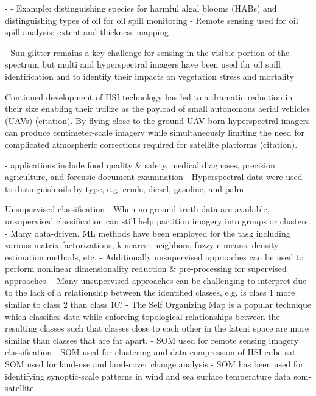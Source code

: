 \documentclass{article}
\begin{document}
- \cite{koponen2002lake}
- Example: distinguishing species for harmful algal blooms (HABs) and distinguishing types of oil for oil spill monitoring
- Remote sensing used for oil spill analysis: extent and thickness mapping \cite{kokaly2013spectroscopic, leifer2012state}

- Sun glitter remains a key challenge for sensing in the visible portion of the spectrum but multi and hyperspectral imagers have been used for oil spill identification and to identify their impacts on vegetation stress and mortality \cite{fingas2014review, khan2018modern}


Continued development of HSI technology has led to a dramatic reduction in their size enabling their utilize as the payload of small autonomous aerial vehicles (UAVs) (citation). By flying close to the ground UAV-born hyperspectral imagers can produce centimeter-scale imagery while simultaneously limiting the need for complicated atmospheric corrections required for satellite platforms (citation).

- applications include food quality & safety, medical diagnoses, precision agriculture, and forensic document examination \cite{khan2018modern}
- Hyperspectral data were used to distinguish oils by type, e.g. crude, diesel, gasoline, and palm \cite{yang2020characterization}


Unsupervised classification
- When no ground-truth data are available, unsupervised classification can still help partition imagery into groups or clusters.
- Many data-driven, ML methods have been employed for the task including various matrix factorizations, k-nearest neighbors, fuzzy c-means, density estimation methods, etc. \cite{zhang2019hyperspectral}
- Additionally unsupervised approaches can be used to perform nonlinear dimensionality reduction & pre-processing for supervised approaches.
- Many unsupervised approaches can be challenging to interpret due to the lack of a relationship between the identified classes, e.g. is class 1 more similar to class 2 than class 10?
- The Self Organizing Map is a popular technique which classifies data while enforcing topological relationships between the resulting classes such that classes close to each  other in the latent space are more similar than classes that are far apart.
- SOM used for remote sensing imagery classification \cite{msom-remote-sensing}
- SOM used for clustering and data compression of HSI cube-sat \cite{danielsen2021self}
- SOM used for land-use and land-cover change analysis \cite{penfound2021analysis}
- SOM has been used for identifying synoptic-scale patterns in wind and sea surface temperature data {som-satellite}
\end{document}
